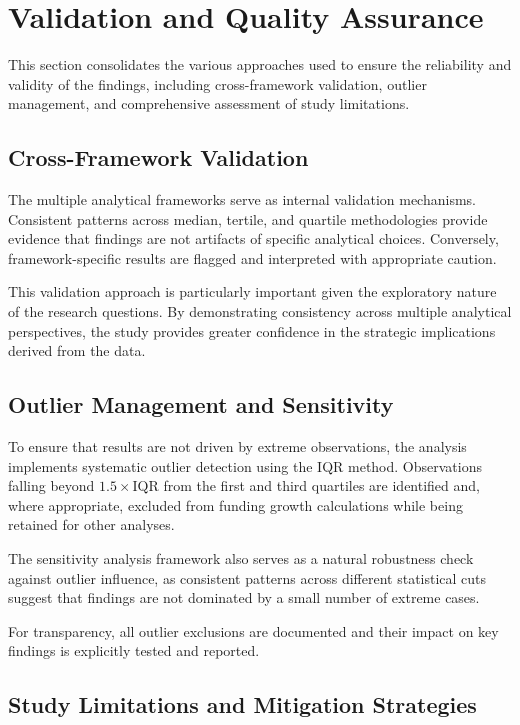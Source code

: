 \section{Validation and Quality Assurance}\label{sec:validation}

This section consolidates the various approaches used to ensure the reliability and validity of the findings, including cross-framework validation, outlier management, and comprehensive assessment of study limitations.

\subsection{Cross-Framework Validation}

The multiple analytical frameworks serve as internal validation mechanisms. Consistent patterns across median, tertile, and quartile methodologies provide evidence that findings are not artifacts of specific analytical choices. Conversely, framework-specific results are flagged and interpreted with appropriate caution.

This validation approach is particularly important given the exploratory nature of the research questions. By demonstrating consistency across multiple analytical perspectives, the study provides greater confidence in the strategic implications derived from the data.

\subsection{Outlier Management and Sensitivity}

To ensure that results are not driven by extreme observations, the analysis implements systematic outlier detection using the \ac{IQR} method. Observations falling beyond $1.5 \times \text{IQR}$ from the first and third quartiles are identified and, where appropriate, excluded from funding growth calculations while being retained for other analyses.

The sensitivity analysis framework also serves as a natural robustness check against outlier influence, as consistent patterns across different statistical cuts suggest that findings are not dominated by a small number of extreme cases.

For transparency, all outlier exclusions are documented and their impact on key findings is explicitly tested and reported.

\subsection{Study Limitations and Mitigation Strategies}

